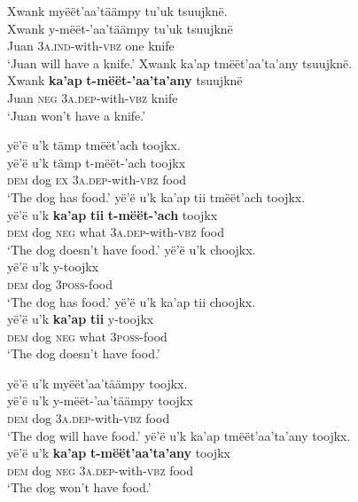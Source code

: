 \documentclass[output=paper,colorlinks,citecolor=brown,draft]{langscibook}
\begin{document}
\ea\label{ex:mix:78}
    \ea\label{ex:mix:78a}
        \glll  Xwank myëët’aa’täämpy tu’uk tsuujknë.\\ 
              Xwank y-mëët-’aa’täämpy tu’uk tsuujknë\\
             Juan \textsc{3a.ind}{}-with-\textsc{vbz} one knife \\
        \glt ‘Juan will have a knife.’
    \ex\label{ex:mix:78b}
        \glll Xwank ka’ap tmëët’aa’ta’any tsuujknë.\\
             Xwank \textbf{ka’ap} \textbf{t-mëët-’aa’ta’any} tsuujknë\\
             Juan \textsc{neg} \textsc{3a.dep}{}-with-\textsc{vbz} knife\\
        \glt ‘Juan won’t have a knife.’
    \z
\z 
 
\ea\label{ex:mix:79}
    \ea\label{ex:mix:79a}
        \glll yë’ë u’k tämp tmëët’ach toojkx.\\ 
              yë’ë u’k tämp t-mëët-’ach toojkx\\
              \textsc{dem} dog \textsc{ex} \textsc{3a.dep}{}-with-\textsc{vbz} food\\
        \glt ‘The dog has food.’
    \ex\label{ex:mix:79b}
        \glll yë’ë u’k ka’ap tii tmëët’ach toojkx. \\
             yë’ë u’k \textbf{ka’ap} \textbf{tii} \textbf{t-mëët-’ach} toojkx\\
             \textsc{dem} dog \textsc{neg} what \textsc{3a.dep}{}-with-\textsc{vbz} food \\
        \glt ‘The dog doesn’t have food.’
    \ex\label{ex:mix:79c}
        \glll yë’ë u’k choojkx.\\ 
              yë’ë u’k y-toojkx\\
              \textsc{dem} dog \textsc{3poss-}food\\
        \glt ‘The dog has food.’
    \ex\label{ex:mix:79d}
        \glll  yë’ë u’k ka’ap tii choojkx. \\
             yë’ë u’k \textbf{ka’ap} \textbf{tii} y-toojkx\\
             \textsc{dem} dog \textsc{neg} what \textsc{3poss-}food\\
        \glt ‘The dog doesn’t have food.’
    \z
\z 
 
\ea\label{ex:mix:80}
    \ea\label{ex:mix:80a}
        \glll yë’ë u’k myëët’aa’täämpy toojkx. \\ 
              yë’ë u’k y-mëët-’aa’täämpy toojkx\\
              \textsc{dem} dog \textsc{3a.dep}{}-with-\textsc{vbz} food\\
        \glt ‘The dog will have food.’
    \ex\label{ex:mix:80b}
        \glll  yë’ë u’k ka’ap tmëët’aa’ta’any toojkx. \\
             yë’ë u’k \textbf{ka’ap} \textbf{t-mëët’aa’ta’any} toojkx\\
             \textsc{dem} dog \textsc{neg} \textsc{3a.dep}{}-with-\textsc{vbz} food\\
        \glt ‘The dog won’t have food.’ 
    \z
\z 
 
\end{document}
